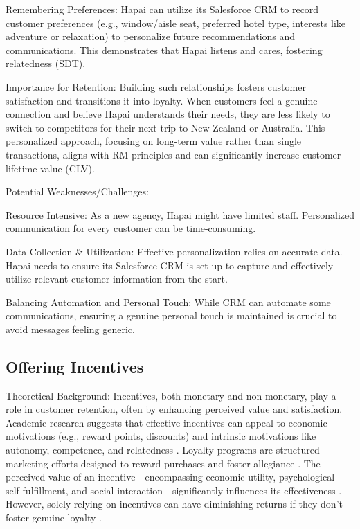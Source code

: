 \documentclass{article}
\begin{document}
Remembering Preferences: Hapai can utilize its Salesforce CRM to record customer preferences (e.g., window/aisle seat, preferred hotel type, interests like adventure or relaxation) to personalize future recommendations and communications. This demonstrates that Hapai listens and cares, fostering relatedness (SDT).

Importance for Retention:
Building such relationships fosters customer satisfaction and transitions it into loyalty. When customers feel a genuine connection and believe Hapai understands their needs, they are less likely to switch to competitors for their next trip to New Zealand or Australia. This personalized approach, focusing on long-term value rather than single transactions, aligns with RM principles and can significantly increase customer lifetime value (CLV).

Potential Weaknesses/Challenges:

Resource Intensive: As a new agency, Hapai might have limited staff. Personalized communication for every customer can be time-consuming.

Data Collection \& Utilization: Effective personalization relies on accurate data. Hapai needs to ensure its Salesforce CRM is set up to capture and effectively utilize relevant customer information from the start.

Balancing Automation and Personal Touch: While CRM can automate some communications, ensuring a genuine personal touch is maintained is crucial to avoid messages feeling generic.

\subsection{Offering Incentives}

Theoretical Background:
Incentives, both monetary and non-monetary, play a role in customer retention, often by enhancing perceived value and satisfaction. Academic research suggests that effective incentives can appeal to economic motivations (e.g., reward points, discounts) and intrinsic motivations like autonomy, competence, and relatedness \cite{wang_exploring_nodate}. Loyalty programs are structured marketing efforts designed to reward purchases and foster allegiance \cite{abooleet_systematic_2023}. The perceived value of an incentive—encompassing economic utility, psychological self-fulfillment, and social interaction—significantly influences its effectiveness \cite{wang_exploring_nodate}. However, solely relying on incentives can have diminishing returns if they don't foster genuine loyalty \cite{abooleet_systematic_2023}.
\end{document}

